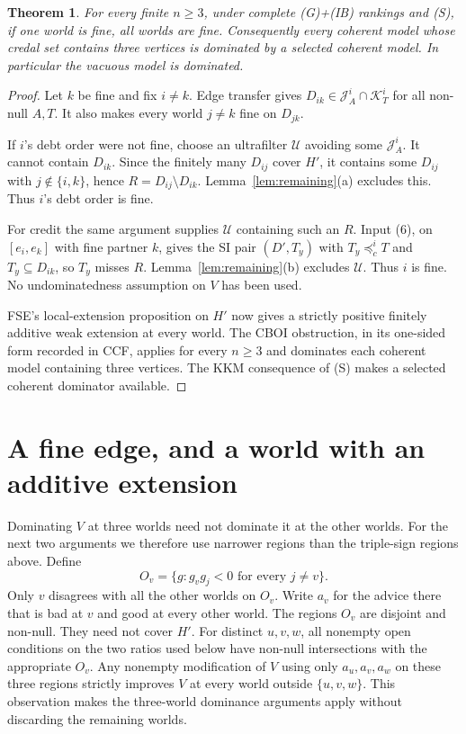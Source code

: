 \documentclass[11pt]{article}
\newtheorem{theorem}{Theorem}
\theoremstyle{remark}\newtheorem{remark}[theorem]{Remark}
\newcommand{\J}{\mathcal J}
\newcommand{\K}{\mathcal K}
\newcommand{\U}{\mathcal U}
\begin{document}
\begin{theorem}\label{thm:allfine}
For every finite $n\ge3$, under complete (G)+(IB) rankings and (S),
if one world is fine, all worlds are fine. Consequently every coherent
model whose credal set contains three vertices is dominated by a selected
coherent model. In particular the vacuous model is dominated.
\end{theorem}
\begin{proof}
Let $k$ be fine and fix $i\ne k$. Edge transfer gives
$D_{ik}\in\J^i_A\cap\K^i_T$ for all non-null $A,T$.
It also makes every world $j\ne k$ fine on $D_{jk}$.

If $i$'s debt order were not fine, choose an ultrafilter $\U$ avoiding
some $\J^i_A$. It cannot contain $D_{ik}$. Since the finitely many
$D_{ij}$ cover $H'$, it contains some $D_{ij}$ with $j\notin\{i,k\}$,
hence $R=D_{ij}\setminus D_{ik}$. Lemma~\ref{lem:remaining}(a)
excludes this. Thus $i$'s debt order is fine.

For credit the same argument supplies $\U$ containing such an $R$.
Input (6), on $[e_i,e_k]$ with fine partner $k$, gives the SI pair
$(D',T_y)$ with $T_y\preceq^i_cT$ and $T_y\subseteq D_{ik}$, so
$T_y$ misses $R$. Lemma~\ref{lem:remaining}(b) excludes $\U$.
Thus $i$ is fine. No undominatedness assumption on $V$ has been used.

FSE's local-extension proposition on $H'$ now gives a strictly positive
finitely additive weak extension at every world. The CBOI obstruction,
in its one-sided form recorded in CCF, applies for every $n\ge3$ and
dominates each coherent model containing three vertices. The KKM
consequence of (S) makes a selected coherent dominator available.
\end{proof}

\section{A fine edge, and a world with an additive extension}

Dominating $V$ at three worlds need not dominate it at the other worlds.
For the next two arguments we therefore use narrower regions than the
triple-sign regions above. Define
\[
 O_v=\{g:g_vg_j<0\text{ for every }j\ne v\}.
\]
Only $v$ disagrees with all the other worlds on $O_v$. Write $a_v$ for
the advice there that is bad at $v$ and good at every other world.
The regions $O_v$ are disjoint and non-null. They need not cover $H'$.
For distinct $u,v,w$, all nonempty open conditions on the two ratios
used below have non-null intersections with the appropriate $O_v$.
Any nonempty modification of $V$ using only $a_u,a_v,a_w$ on these
three regions strictly improves $V$ at every world outside
$\{u,v,w\}$. This observation makes the three-world dominance
arguments apply without discarding the remaining worlds.
\end{document}

